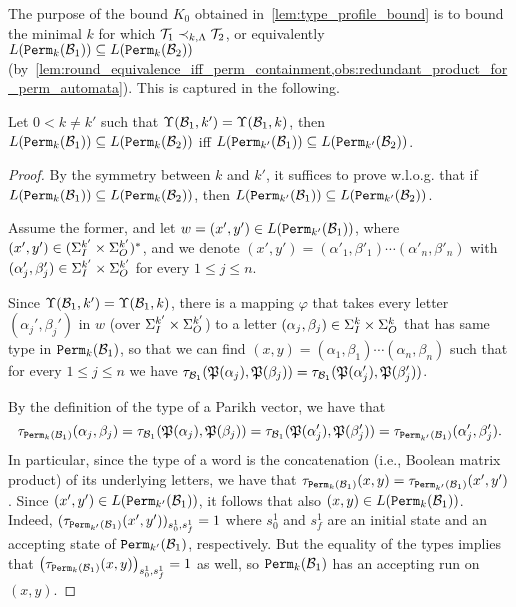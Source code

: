 The purpose of the bound $K_0$ obtained in~\cref{lem:type_profile_bound} is to bound the minimal $k$ for which $\mathcal{T}_1\prec_{k,\Lambda} \mathcal{T}_2$, or equivalently $L({\mathtt{Perm}}_{k}(\mathcal{B}_1))\subseteq L({\mathtt{Perm}}_{k}(\mathcal{B}_2))$ (by~\cref{lem:round_equivalence_iff_perm_containment,obs:redundant_product_for_perm_automata}).
This is captured in the following.

\begin{lemma}
	\label{lem:profile_equality_to_simulation}
	Let $0<k\neq k'$ such that $\Upsilon(\mathcal{B}_1,k')=\Upsilon(\mathcal{B}_1,k)$, then
	$L({\mathtt{Perm}}_{k}(\mathcal{B}_1))\subseteq L({\mathtt{Perm}}_{k}(\mathcal{B}_2))$ iff $L({\mathtt{Perm}}_{k'}(\mathcal{B}_1))\subseteq L({\mathtt{Perm}}_{k'}(\mathcal{B}_2))$.
\end{lemma}
\begin{proof}

By the symmetry between $k$ and $k'$, it suffices to prove w.l.o.g. that if $L({\mathtt{Perm}}_{k}(\mathcal{B}_1))\subseteq L({\mathtt{Perm}}_{k}(\mathcal{B}_2))$, then $L({\mathtt{Perm}}_{k'}(\mathcal{B}_1))\subseteq L({\mathtt{Perm}}_{k'}(\mathcal{B}_2))$.

Assume the former, and let $w=(x',y')\in L({\mathtt{Perm}}_{k'}(\mathcal{B}_1))$, where $(x',y')\in (\Sigma_{I}^{k'}\times \Sigma_{O}^{k'})^*$, and we denote $(x',y')=(\alpha'_1,\beta'_1)\cdots (\alpha'_n,\beta'_n)$ with $(\alpha'_j,\beta'_j)\in \Sigma_{I}^{k'}\times \Sigma_{O}^{k'}$ for every $1\le j\le n$. 

Since $\Upsilon(\mathcal{B}_1,k')=\Upsilon(\mathcal{B}_1,k)$, there is a mapping $\varphi$ that takes every letter $(\alpha_j',\beta_j')$ in $w$ (over $\Sigma_{I}^{k'}\times \Sigma_{O}^{k'}$) to a letter $(\alpha_j,\beta_j)\in\Sigma_{I}^{k}\times \Sigma_{O}^{k}$ that has same type in ${\mathtt{Perm}}_{k}(\mathcal{B}_1)$, so that we can find $(x,y)=(\alpha_1,\beta_1)\cdots (\alpha_n,\beta_n)$ such that for every $1\le j\le n$ we have $\tau_{\mathcal{B}_1}(\mathfrak{P}(\alpha_j),\mathfrak{P}(\beta_j))=\tau_{\mathcal{B}_1}(\mathfrak{P}(\alpha'_j),\mathfrak{P}(\beta'_j))$. 

By the definition of the type of a Parikh vector, we have that \[\tau_{{\mathtt{Perm}}_k(\mathcal{B}_1)}(\alpha_j,\beta_j)=\tau_{\mathcal{B}_1}(\mathfrak{P}(\alpha_j),\mathfrak{P}(\beta_j))=\tau_{\mathcal{B}_1}(\mathfrak{P}(\alpha'_j),\mathfrak{P}(\beta'_j))=\tau_{{\mathtt{Perm}}_{k'}(\mathcal{B}_1)}(\alpha'_j,\beta'_j).\]
In particular, since the type of a word is the concatenation (i.e., Boolean matrix product) of its underlying letters, we have that $\tau_{{\mathtt{Perm}}_k(\mathcal{B}_1)}(x,y)=\tau_{{\mathtt{Perm}}_{k'}(\mathcal{B}_1)}(x',y')$. Since $(x',y')\in L({\mathtt{Perm}}_{k'}(\mathcal{B}_1))$, it follows that also $(x,y)\in L({\mathtt{Perm}}_{k}(\mathcal{B}_1))$. Indeed, 
$(\tau_{{\mathtt{Perm}}_{k'}(\mathcal{B}_1)}(x',y'))_{s^1_0,s^1_f}=1$ where $s^1_0$ and $s^1_f$ are an initial state and an accepting state of ${\mathtt{Perm}}_{k'}(\mathcal{B}_1)$, respectively. But the equality of the types implies that $\left(\tau_{{\mathtt{Perm}}_{k}(\mathcal{B}_1)}(x,y)\right)_{s^1_0,s^1_f}=1$ as well, so ${\mathtt{Perm}}_k(\mathcal{B}_1)$ has an accepting run on $(x,y)$.


\end{proof}
